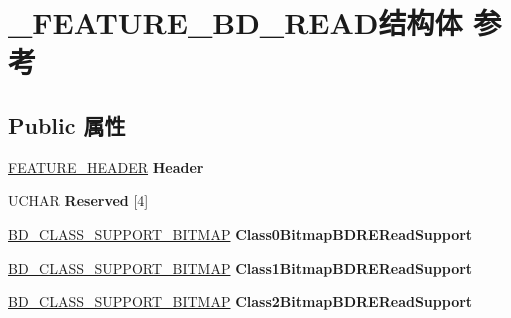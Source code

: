 \hypertarget{struct___f_e_a_t_u_r_e___b_d___r_e_a_d}{}\section{\+\_\+\+F\+E\+A\+T\+U\+R\+E\+\_\+\+B\+D\+\_\+\+R\+E\+A\+D结构体 参考}
\label{struct___f_e_a_t_u_r_e___b_d___r_e_a_d}
\subsection*{Public 属性}
\begin{DoxyCompactItemize}
\item 
\mbox{\label{struct___f_e_a_t_u_r_e___b_d___r_e_a_d_a9e7dc4a9d7f130169be18c6341a3833f}} 
\hyperlink{struct___f_e_a_t_u_r_e___h_e_a_d_e_r}{F\+E\+A\+T\+U\+R\+E\+\_\+\+H\+E\+A\+D\+ER} {\bfseries Header}
\item 
\mbox{\label{struct___f_e_a_t_u_r_e___b_d___r_e_a_d_a474ee684918fc10760e43a3dd77975e1}} 
U\+C\+H\+AR {\bfseries Reserved} \mbox{[}4\mbox{]}
\item 
\mbox{\label{struct___f_e_a_t_u_r_e___b_d___r_e_a_d_acd26679e585adb495caccceb224a06b6}} 
\hyperlink{struct___b_d___c_l_a_s_s___s_u_p_p_o_r_t___b_i_t_m_a_p}{B\+D\+\_\+\+C\+L\+A\+S\+S\+\_\+\+S\+U\+P\+P\+O\+R\+T\+\_\+\+B\+I\+T\+M\+AP} {\bfseries Class0\+Bitmap\+B\+D\+R\+E\+Read\+Support}
\item 
\mbox{\label{struct___f_e_a_t_u_r_e___b_d___r_e_a_d_afddd5c42fd043e03005e5a74139adfc7}} 
\hyperlink{struct___b_d___c_l_a_s_s___s_u_p_p_o_r_t___b_i_t_m_a_p}{B\+D\+\_\+\+C\+L\+A\+S\+S\+\_\+\+S\+U\+P\+P\+O\+R\+T\+\_\+\+B\+I\+T\+M\+AP} {\bfseries Class1\+Bitmap\+B\+D\+R\+E\+Read\+Support}
\item 
\mbox{\label{struct___f_e_a_t_u_r_e___b_d___r_e_a_d_a3b57cf0f851888ac3aaf23887f2056e3}} 
\hyperlink{struct___b_d___c_l_a_s_s___s_u_p_p_o_r_t___b_i_t_m_a_p}{B\+D\+\_\+\+C\+L\+A\+S\+S\+\_\+\+S\+U\+P\+P\+O\+R\+T\+\_\+\+B\+I\+T\+M\+AP} {\bfseries Class2\+Bitmap\+B\+D\+R\+E\+Read\+Support}
\item 

\end{DoxyCompactItemize}
